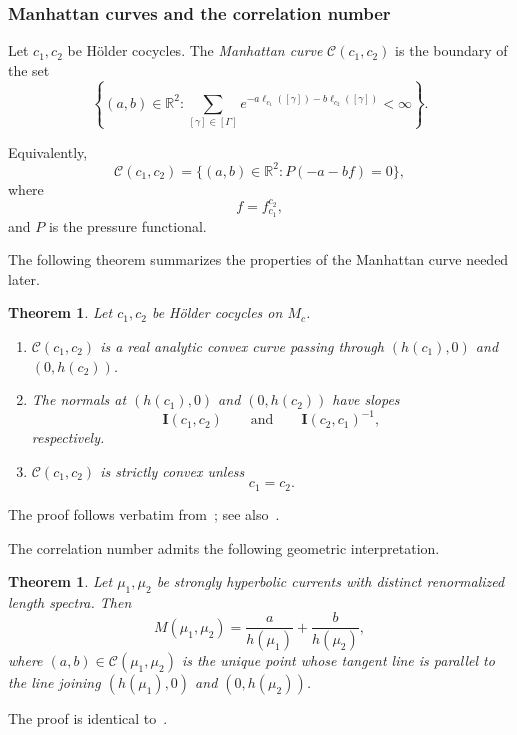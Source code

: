 \documentclass[12pt]{amsart}
\numberwithin{equation}{section}
\numberwithin{figure}{section}
\newtheorem{theorem}[equation]{Theorem}
\theoremstyle{definition}
\theoremstyle{plain}
\begin{document}
\subsubsection{Manhattan curves and the correlation number}
\label{subsubsec:manhattan}

Let $c_1,c_2$ be H\"older cocycles. The \emph{Manhattan curve} $\mathcal C(c_1,c_2)$ is the boundary of the set
\[
\left\{
(a,b)\in\mathbb R^2:
\sum_{[\gamma]\in[\Gamma]}
e^{-a\ell_{c_1}([\gamma])-b\ell_{c_2}([\gamma])}
<
\infty
\right\}.
\]

Equivalently,
\[
\mathcal C(c_1,c_2)
=
\{
(a,b)\in\mathbb R^2:
P(-a-bf)=0
\},
\]
where
\[
f=f_{c_1}^{c_2},
\]
and $P$ is the pressure functional.

The following theorem summarizes the properties of the Manhattan curve needed later.

\begin{theorem}
\label{PropertyManhattan}
Let $c_1,c_2$ be H\"older cocycles on $M_c$.
\begin{enumerate}
    \item $\mathcal C(c_1,c_2)$ is a real analytic convex curve passing through $(h(c_1),0)$ and $(0,h(c_2))$.
    
    \item The normals at $(h(c_1),0)$ and $(0,h(c_2))$ have slopes
    \[
    \mathbf I(c_1,c_2)
    \qquad\text{and}\qquad
    \mathbf I(c_2,c_1)^{-1},
    \]
    respectively.
    
    \item $\mathcal C(c_1,c_2)$ is strictly convex unless
    \[
    c_1=c_2.
    \]
\end{enumerate}
\end{theorem}

The proof follows verbatim from~\cite[Theorem~4.1]{DM23:Correlation}; see also~\cite{Bur93:Manhattan,CT25:Manhattan,COR22:Manhattan}.

The correlation number admits the following geometric interpretation.

\begin{theorem}
\label{thm:Manhattan}
Let $\mu_1,\mu_2$ be strongly hyperbolic currents with distinct renormalized length spectra. Then
\[
M(\mu_1,\mu_2)
=
\frac{a}{h(\mu_1)}
+
\frac{b}{h(\mu_2)},
\]
where $(a,b)\in\mathcal C(\mu_1,\mu_2)$ is the unique point whose tangent line is parallel to the line joining $(h(\mu_1),0)$ and $(0,h(\mu_2))$.
\end{theorem}

The proof is identical to~\cite[Theorem~4.2]{DM23:Correlation}.
\end{document}

